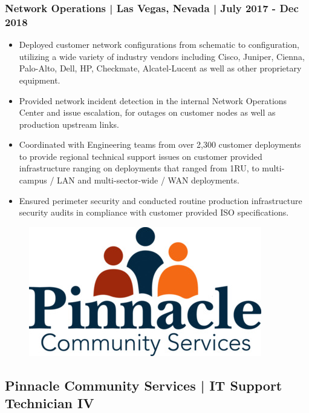 \documentclass[letter,10pt]{article}
\begin{document}
\subsubsection*{Network Operations | Las Vegas, Nevada | July 2017 - Dec 2018}
\label{sec:org1a12f9e}
\begin{itemize}
\item Deployed customer network configurations from schematic to configuration, utilizing a wide variety of industry vendors including Cisco, Juniper, Cienna, Palo-Alto, Dell, HP, Checkmate, Alcatel-Lucent as well as other proprietary equipment.
\item Provided network incident detection in the internal Network Operations Center and issue escalation, for outages on customer nodes as well as production upstream links.
\item Coordinated with Engineering teams from over 2,300 customer deployments to provide regional technical support issues on customer provided infrastructure ranging on deployments that ranged from 1RU, to multi-campus / LAN and multi-sector-wide / WAN deployments.
\item Ensured perimeter security and conducted routine production infrastructure security audits in compliance with customer provided ISO specifications.
\end{itemize}




\begin{figure}
\includegraphics[width=0.8\linewidth]{./img/50p_cr_pinnacle.jpg}
\end{figure}

\subsection*{Pinnacle Community Services | IT Support Technician IV}
\label{sec:orgb5cc48e}
\end{document}
